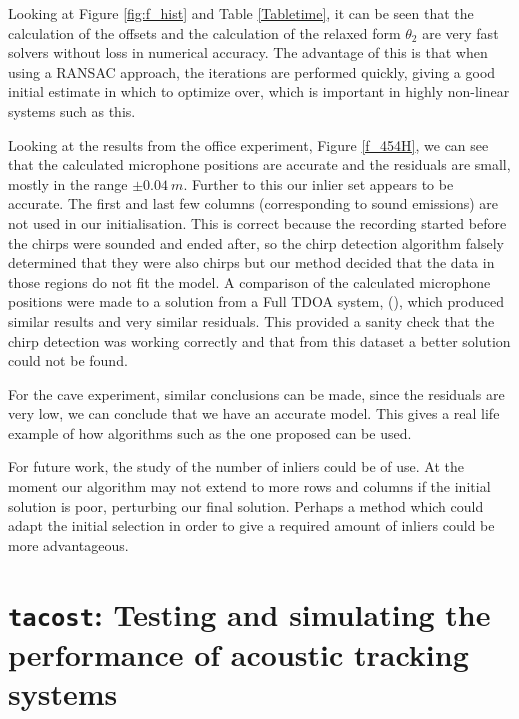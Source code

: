 \documentclass[
]{book}
\begin{document}
Looking at Figure \ref{fig:f_hist} and Table \ref{Tabletime}, it can be seen that the calculation of the offsets and the calculation of the relaxed form \(\theta_2\) are very fast solvers without loss in numerical accuracy. The advantage of this is that when using a RANSAC approach, the iterations are performed quickly, giving a good initial estimate in which to optimize over, which is important in highly
non-linear systems such as this.

Looking at the results from the office experiment, Figure \ref{f_454H}, we can see that the calculated microphone positions are accurate and the residuals are small, mostly in the range \(\pm 0.04~m\). Further to this our inlier set appears to be accurate. The first and last few columns (corresponding to sound emissions) are not used in our initialisation. This is correct because the recording started before the chirps were sounded and ended after, so the chirp detection algorithm falsely determined that they were also chirps but our method decided that the data in those regions do not fit the model. A comparison of the calculated microphone positions were made to a solution from a Full TDOA system, (\cite{kuang2013stratified}), which produced similar results and very similar residuals. This provided a sanity check that the chirp detection was working correctly and that from this dataset a better solution could not be found.

For the cave experiment, similar conclusions can be made, since the residuals are very low, we can conclude that we have an accurate model. This gives a real life example of how algorithms such as the one proposed can be used.

For future work, the study of the number of inliers could be of use. At the moment our algorithm may not extend to more rows and columns if the initial solution is poor, perturbing our final solution. Perhaps a method which could adapt the initial selection in order to give a required amount of inliers could be more advantageous.

\hypertarget{tacost-testing-and-simulating-the-performance-of-acoustic-tracking-systems}{%
\chapter{\texorpdfstring{\texttt{tacost}: Testing and simulating the performance of acoustic tracking systems}{tacost: Testing and simulating the performance of acoustic tracking systems}}\label{tacost-testing-and-simulating-the-performance-of-acoustic-tracking-systems}}
\end{document}
